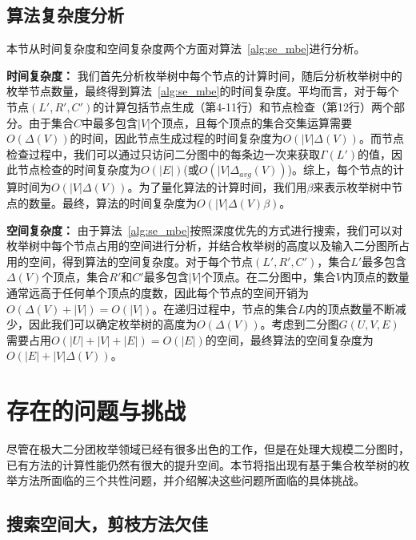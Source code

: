 \subsection{算法复杂度分析}
\label{subsec:baseline_analysis}

本节从时间复杂度和空间复杂度两个方面对算法~\ref{alg:se_mbe}进行分析。

\textbf{时间复杂度：} 我们首先分析枚举树中每个节点的计算时间，随后分析枚举树中的枚举节点数量，最终得到算法~\ref{alg:se_mbe}的时间复杂度。平均而言，对于每个节点$(L',R',C')$的计算包括节点生成（第4-11行）和节点检查（第12行）两个部分。由于集合$C$中最多包含$|V|$个顶点，且每个顶点的集合交集运算需要$O(\Delta(V))$的时间，因此节点生成过程的时间复杂度为$O(|V|\Delta(V))$。而节点检查过程中，我们可以通过只访问二分图中的每条边一次来获取$\Gamma(L')$的值，因此节点检查的时间复杂度为$O(|E|)$(或$O(|V|\Delta_{avg}(V))$)。综上，每个节点的计算时间为$O(|V|\Delta(V))$。为了量化算法的计算时间，我们用$\beta$来表示枚举树中节点的数量。最终，算法的时间复杂度为$O(|V|\Delta(V)\beta)$。

\textbf{空间复杂度：} 由于算法~\ref{alg:se_mbe}按照深度优先的方式进行搜索，我们可以对枚举树中每个节点占用的空间进行分析，并结合枚举树的高度以及输入二分图所占用的空间，得到算法的空间复杂度。对于每个节点$(L',R',C')$，集合$L'$最多包含$\Delta(V)$个顶点，集合$R'$和$C'$最多包含$|V|$个顶点。在二分图中，集合$V$内顶点的数量通常远高于任何单个顶点的度数，因此每个节点的空间开销为$O(\Delta(V)+|V|)=O(|V|)$。在递归过程中，节点的集合$L$内的顶点数量不断减少，因此我们可以确定枚举树的高度为$O(\Delta(V))$。考虑到二分图$G(U,V,E)$需要占用$O(|U|+|V|+|E|)=O(|E|)$的空间，最终算法的空间复杂度为$O(|E|+|V|\Delta(V))$。

\section{存在的问题与挑战}

尽管在极大二分团枚举领域已经有很多出色的工作，但是在处理大规模二分图时，已有方法的计算性能仍然有很大的提升空间。本节将指出现有基于集合枚举树的枚举方法所面临的三个共性问题，并介绍解决这些问题所面临的具体挑战。

\subsection{搜索空间大，剪枝方法欠佳}

